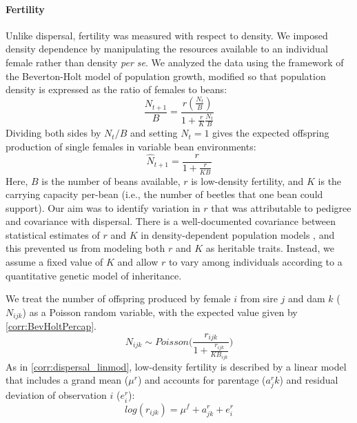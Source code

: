 \paragraph{Fertility}
Unlike dispersal, fertility was measured with respect to density. We imposed density dependence by manipulating the resources available to an individual female rather than density \textit{per se}. We analyzed the data using the framework of the Beverton-Holt model of population growth, modified so that population density is expressed as the ratio of females to beans:
%
\begin{equation}\label{corr:BevHoltFull}
  \frac{N_{t+1}}{B} = \frac{r(\frac{N_{t}}{B})}{1 + \frac{r}{K}\frac{N_{t}}{B}}
\end{equation}
%
Dividing both sides by $N_{t}/B$ and setting $N_{t}=1$ gives the expected offspring production of single females in variable bean environments:
%
\begin{equation}\label{corr:BevHoltPercap}
  \hat{N}_{t+1} = \frac{r}{1 + \frac{r}{KB}}
\end{equation}
%
Here, $B$ is the number of beans available, $r$ is low-density fertility, and $K$ is the carrying capacity per-bean (i.e., the number of beetles that one bean could support).  Our aim was to identify variation in $r$ that was attributable to pedigree and covariance with dispersal. There is a well-documented covariance between statistical estimates of $r$ and $K$ in density-dependent population models \citep{hilborn_quantitative_1992}, and this prevented us from modeling both $r$ and $K$ as heritable traits. Instead, we assume a fixed value of $K$ and allow $r$ to vary among individuals according to a quantitative genetic model of inheritance. 

We treat the number of offspring produced by female $i$ from sire $j$ and dam $k$ ($N_{ijk}$) as a Poisson random variable, with the expected value given by \ref{corr:BevHoltPercap}.
%
\begin{equation}\label{corr:Noff_ran}
  N_{ijk} \sim \mathit{Poisson}\Big(\frac{r_{ijk}} {1 + \frac{r_{ijk}}{KB_{ijk} }}\Big)
\end{equation}
%
As in \ref{corr:dispersal_linmod}, low-density fertility is described by a linear model that includes a grand mean ($\mu^{r}$) and accounts for parentage ($a^{r}_jk$) and residual deviation of observation $i$ ($e^{r}_i$):
%
\begin{equation} \label{corr:fert_linmod}
  log(r_{ijk}) = \mu^{f} + a^{r}_{jk} + e^{r}_{i}
\end{equation}
%

